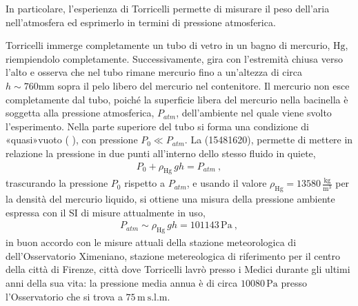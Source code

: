 \documentclass[letterpaper,10pt,italian]{jupyterBook}
\begin{document}
\sphinxAtStartPar
In particolare, l’esperienza di Torricelli permette di misurare il peso dell’aria nell’atmosfera ed esprimerlo in termini di pressione atmosferica.

\sphinxAtStartPar
Torricelli immerge completamente un tubo di vetro in un bagno di mercurio, \(\text{Hg}\), riempiendolo completamente. Successivamente, gira con l’estremità chiusa verso l’alto e osserva che nel tubo rimane mercurio fino a un’altezza di circa \(h \sim 760 \text{mm}\) sopra il pelo libero del mercurio nel contenitore. Il mercurio non esce completamente dal tubo, poiché la superficie libera del mercurio nella bacinella è soggetta alla pressione atmosferica, \(P_{atm}\), dell’ambiente nel quale viene svolto l’esperimento. Nella parte superiore del tubo si forma una condizione di «quasi»\sphinxhyphen{}vuoto ( ), con pressione \(P_0 \ll P_{atm}\). La {\hyperref[\detokenize{ch/mechanics/statics-fluid:physics-hs-mechanics-statics-fluid-stevino}]{}} (1548\sphinxhyphen{}1620), permette di mettere in relazione la pressione in due punti all’interno dello stesso fluido in quiete,
\begin{equation*}
\begin{split}P_0 + \rho_{\text{Hg}} \, g h = P_{atm} \ ,\end{split}
\end{equation*}
\sphinxAtStartPar
trascurando la pressione \(P_0\) rispetto a \(P_{atm}\), e usando il valore \(\rho_{\text{Hg}} = 13580 \, \frac{\text{kg}}{\text{m}^3}\) per la densità del mercurio liquido, si ottiene una misura della pressione ambiente espressa con il SI di misure attualmente in uso,
\begin{equation*}
\begin{split}P_{atm} \sim \rho_{\text{Hg}} \, g h = 101143 \, \text{Pa} \ ,\end{split}
\end{equation*}
\sphinxAtStartPar
in buon accordo con le misure attuali della stazione meteorologica di dell’Osservatorio Ximeniano, stazione metereologica di riferimento per il centro della città di Firenze, città dove Torricelli lavrò presso i Medici durante gli ultimi anni della sua vita: la pressione media annua è di circa \(10080 \, \text{Pa}\) presso l’Osservatorio che si trova a \(75 \, \text{m} \ \text{s.l.m}.\)
\end{document}
